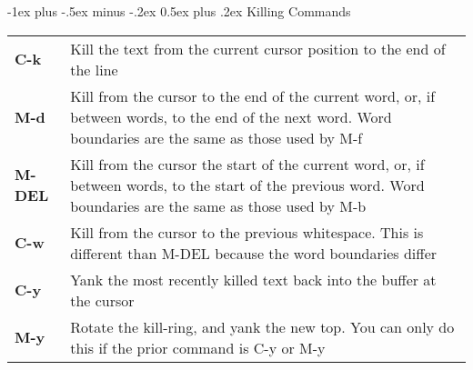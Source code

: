 \documentclass[10pt,landscape]{article}
\makeatletter
\renewcommand{\section}{\@startsection{section}{1}{0mm}%
	{-1ex plus -.5ex minus -.2ex}%
	{0.5ex plus .2ex}%
	{\normalfont\large\bfseries}}
\newcommand{\commandfmt}[1]{\ttfamily\bfseries #1}
\newcommand{\command}[2]{\commandfmt{#1} & #2 \\}
\newenvironment{commands}
{\settowidth{\MyLen}{\commandfmt{Backspace..}}
	\begin{tabular}{@{}p{\the\MyLen}%
			@{}p{\linewidth-\the\MyLen}@{}}}{\end{tabular}}
\newlength{\MyLen}
\makeatother
\begin{document}
\begin{multicols*}{3}
\section{Killing Commands}
\begin{commands}
  \command{C-k}{Kill the text from the current cursor position to the end of the line}
  \command{M-d}{Kill from the cursor to the end of the current word, or, if between words, to the end of the next word. Word boundaries are the same as those used by M-f}
  \command{M-DEL}{Kill from the cursor the start of the current word, or, if between words, to the start of the previous word. Word boundaries are the same as those used by M-b}
  \command{C-w}{Kill from the cursor to the previous whitespace. This is different than M-DEL because the word boundaries differ}


  \command{C-y}{Yank the most recently killed text back into the buffer at the cursor}
  \command{M-y}{Rotate the kill-ring, and yank the new top. You can only do this if the prior command is C-y or M-y}	
\end{commands}
\end{multicols*}
\end{document}
